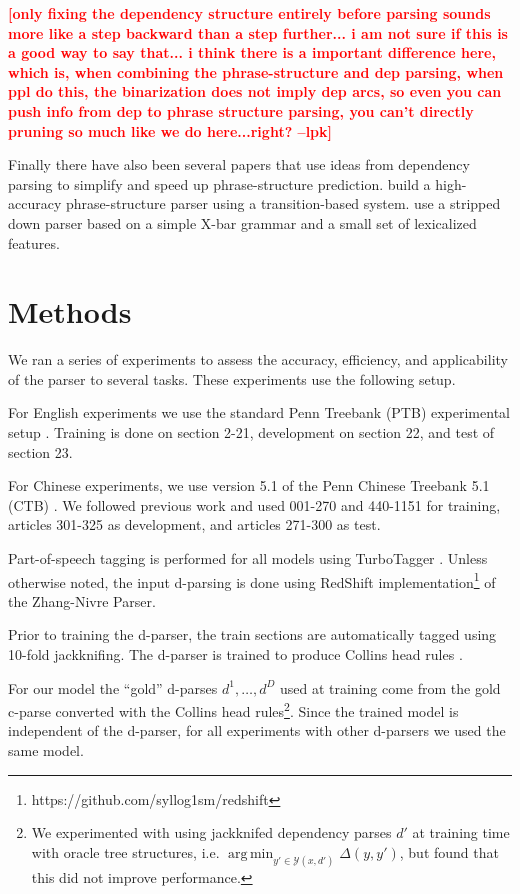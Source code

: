 \documentclass[11pt,letterpaper]{article}
\DeclareMathOperator*{\argmin}{arg\,min}
\newcommand{\lpkcomment}[1]{\textcolor{red}{\bf \small [#1 --lpk]}}
\begin{document}

\lpkcomment{only fixing the dependency structure
entirely before parsing sounds more like a step backward than a step further... i am not sure if this is a good way to say that... i think there is a important difference here, which is, when combining the phrase-structure and dep parsing, when ppl do this, the binarization does not imply dep arcs, so even you can push info from dep to phrase structure parsing, you can't directly pruning so much like we do here...right?}


Finally there have also been several papers that use ideas from
dependency parsing to simplify and speed up phrase-structure prediction.
 build a high-accuracy phrase-structure parser
using a transition-based system.  use a stripped
down parser based on a simple X-bar grammar and a small set of lexicalized features.



\section{Methods}

We ran a series of experiments to assess the accuracy, efficiency,
and applicability of the parser to several tasks. These experiments
use the following setup.  

For English experiments we use the standard Penn Treebank (PTB)
experimental setup \cite{marcus1993building}. Training is done on
section 2-21, development on section 22, and test of section 23.

For Chinese experiments, we use version 5.1 of the Penn  Chinese Treebank 5.1 (CTB) \cite{xue2005penn}. We followed previous work and used
001-270 and 440-1151 for training, articles
301-325 as development, and articles
271-300 as test.

Part-of-speech tagging is performed for all models  using TurboTagger
\cite{martins2013turning}. Unless otherwise noted, the input d-parsing
is done using RedShift
implementation\footnote{https://github.com/syllog1sm/redshift} of the
Zhang-Nivre Parser\cite{zhang2011transition}.

  
Prior to training the d-parser, the train sections are
automatically tagged using 10-fold jackknifing. The 
d-parser is trained to produce Collins head rules 
\cite{collins2003head}.

For our model the ``gold'' d-parses $d^1, \ldots, d^D$   
used at training come from the gold c-parse converted with 
the Collins head rules\footnote{ We experimented with using
  jackknifed dependency parses $d'$ at training time with oracle tree
  structures, i.e. $\argmin_{y' \in \mathcal{Y}(x, d')} \Delta(y, y')$,
  but found that this did not improve performance.}. Since the trained
model is independent of the d-parser,  
for all experiments with other d-parsers we used the same model.
\end{document}
